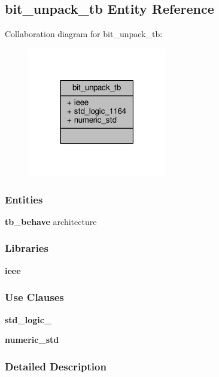 \subsection{bit\+\_\+unpack\+\_\+tb Entity Reference}
\label{classbit__unpack__tb}


Collaboration diagram for bit\+\_\+unpack\+\_\+tb\+:\nopagebreak
\begin{figure}[H]
\begin{center}
\leavevmode
\includegraphics[width=171pt]{d9/d31/classbit__unpack__tb__coll__graph}
\end{center}
\end{figure}
\subsubsection*{Entities}
\begin{DoxyCompactItemize}
\item 
{\bf tb\+\_\+behave} architecture
\end{DoxyCompactItemize}
\subsubsection*{Libraries}
 \begin{DoxyCompactItemize}
\item 
{\bf ieee} 
\end{DoxyCompactItemize}
\subsubsection*{Use Clauses}
 \begin{DoxyCompactItemize}
\item 
{\bf std\+\_\+logic\+\_}   
\item 
{\bf numeric\+\_\+std}   
\end{DoxyCompactItemize}


\subsubsection{Detailed Description}


